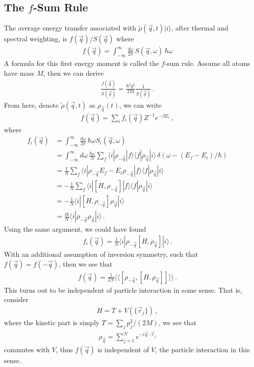 \documentclass[11pt, oneside]{book}
\theoremstyle{break}
\theoremstyle{break}
\newcommand{\that}[1]{\widetilde{#1}}
\begin{document}
\subsection{The \texorpdfstring{$f$}{f}-Sum Rule}
The average energy transfer associated with $\that{\rho}(\vec{q}, t) |i\rangle $, after thermal and spectral weighting, is $f(\vec{q})/S(\vec{q})$ where
\begin{align*}
f(\vec{q}) = \int_{-\infty}^\infty \frac{d\omega}{2\pi}\, S(\vec{q},\omega) \,\hbar\omega
\end{align*}
A formula for this first energy moment is called the $f$-sum rule. Assume all atoms have mass $M$, then we can derive
\begin{align*}
\frac{f(\vec{q})}{S(\vec{q})} = \frac{\hbar^2 q^2}{2M} \frac{1}{S(\vec{q})}\,.
\end{align*}
From here, denote $\that{\rho}(\vec{q},t)$ as $\rho_{\vec{q}}(t)$, we can write
\begin{align*}
f(\vec{q}) = \sum_i f_i(\vec{q}) Z^{-1}e^{-\beta E_i}\,,
\end{align*}
where 
\begin{align*}
f_i(\vec{q}) &= \int_{-\infty}^\infty \frac{d\omega}{2\pi}\,\hbar\omega S_i(\vec{q},\omega)\\
&= \int_{-\infty}^{\infty} d\omega \, \frac{ \hbar	\omega}{N}\sum_f \langle i |\rho_{-\vec{q}}|f\rangle\langle f|\rho_{\vec{q}}|i\rangle \,\delta(\omega - (E_f- E_i)/\hbar)\\
&=\frac{1}{N}\sum_f \langle i | \rho_{-\vec{q}}E_f - E_i \rho_{-\vec{q}}|f\rangle\langle f | \rho_{\vec{q}}|i\rangle\\
&= -\frac{1}{N}\sum_f \langle i | [H, \rho_{-\vec{q}}] | f\rangle\langle f | \rho_{\vec{q}}|i\rangle\\
&= -\frac{1}{N}\langle i | [H, \rho_{-\vec{q}}]\rho_{\vec{q}}|i\rangle\\
&= \frac{i\hbar}{N}\langle i | \dot{\rho}_{-\vec{q}}\rho_{\vec{q}}|i\rangle\,.
\end{align*}
Using the same argument, we could have found 
\begin{align*}
f_i(\vec{q}) = \frac{1}{N}\langle i | \rho_{-\vec{q}}[H, \rho_{\vec{q}}]|i\rangle\,.
\end{align*}
With an additional assumption of inversion symmetry, such that $f(\vec{q}) = f(-\vec{q})$, then we see that 
\begin{align*}
f(\vec{q}) = \frac{1}{2N}\langle\langle [\rho_{-\vec{q}}, [H, \rho_{\vec{q}}]]\rangle\rangle\,.
\end{align*} 
This turns out to be independent of particle interaction in some sense. That is, consider 
\begin{align*}
H = T + V(\{\vec{r}_j\})\,,
\end{align*}
where the kinetic part is simply $T = \sum_j p_j^2/(2M)$, we see that 
\begin{align*}
\rho_{\vec{q}} = \sum_{j=1}^N e^{-i\vec{q}\cdot \vec{r}_j}
\end{align*}
commutes with $V$, thus $f(\vec{q})$ is independent of $V$, the particle interaction in this sense. \\
\end{document}
